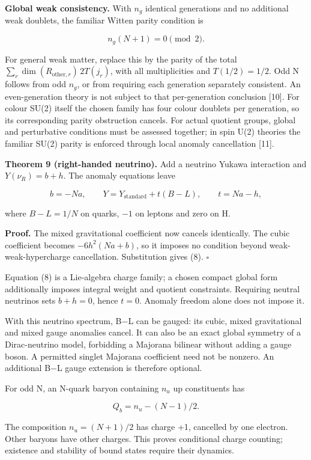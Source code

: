 \documentclass[
  11pt,
  a4paper,
]{article}
\begin{document}
\textbf{Global weak consistency.} With \(n_g\) identical generations and no additional weak doublets, the familiar Witten parity condition is

\[
 n_g(N+1)=0\pmod2. \tag{7}
\]

For general weak matter, replace this by the parity of the total \(\sum_r \dim(R_{\mathrm{other},r})\,2T(j_r)\), with all multiplicities and \(T(1/2)=1/2\). Odd N follows from odd \(n_g\), or from requiring each generation separately consistent. An even-generation theory is not subject to that per-generation conclusion {[}10{]}. For colour SU(2) itself the chosen family has four colour doublets per generation, so its corresponding parity obstruction cancels. For actual quotient groups, global and perturbative conditions must be assessed together; in spin U(2) theories the familiar SU(2) parity is enforced through local anomaly cancellation {[}11{]}.

\textbf{Theorem 9 (right-handed neutrino).} Add a neutrino Yukawa interaction and \(Y(\nu_R)=b+h\). The anomaly equations leave

\[
 b=-Na,\qquad
 Y=Y_{\mathrm{standard}}+t(B-L),\qquad t=Na-h, \tag{8}
\]

where \(B-L=1/N\) on quarks, \(-1\) on leptons and zero on H.

\textbf{Proof.} The mixed gravitational coefficient now cancels identically. The cubic coefficient becomes \(-6h^2(Na+b)\), so it imposes no condition beyond weak-weak-hypercharge cancellation. Substitution gives (8). \(\square\)

Equation (8) is a Lie-algebra charge family; a chosen compact global form additionally imposes integral weight and quotient constraints. Requiring neutral neutrinos sets \(b+h=0\), hence \(t=0\). Anomaly freedom alone does not impose it.

With this neutrino spectrum, B−L can be gauged: its cubic, mixed gravitational and mixed gauge anomalies cancel. It can also be an exact global symmetry of a Dirac-neutrino model, forbidding a Majorana bilinear without adding a gauge boson. A permitted singlet Majorana coefficient need not be nonzero. An additional B−L gauge extension is therefore optional.

For odd N, an N-quark baryon containing \(n_u\) up constituents has

\[
 Q_b=n_u-(N-1)/2.
\]

The composition \(n_u=(N+1)/2\) has charge +1, cancelled by one electron. Other baryons have other charges. This proves conditional charge counting; existence and stability of bound states require their dynamics.
\end{document}
